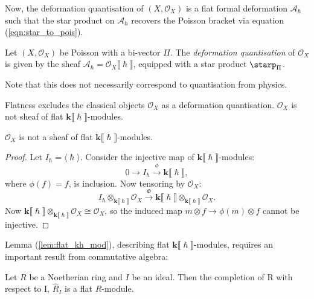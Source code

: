     
    

    Now, the deformation quantisation of \( (X,\mathcal{O}_X)\) is a flat formal deformation \( \mathcal{A}_{\hslash}\) such that the star product on \( \mathcal{A}_{\hslash}\) recovers the Poisson bracket via equation (\ref{eqn:star_to_pois}).

    \begin{defn} 
    \label{defn:def_quant}
    Let \( (X,\mathcal{O}_X)\) be Poisson with a bi-vector \( \Pi\). The \emph{deformation quantisation} of \( \mathcal{O}_X\) is given by the sheaf \( \mathcal{A}_{\hslash} = \mathcal{O}_X \lBrack \hslash \rBrack \), equipped with a star product \( \starp_{\Pi} \).
    \end{defn}
    Note that this does not necessarily correspond to quantisation from physics.

    
    
    Flatness excludes the classical objects \( \mathcal{O}_X\) as a deformation quantisation. \(\mathcal{O}_X\) is not sheaf of flat \( \mathbf{k}\lBrack \hslash \rBrack\)-modules.




    \begin{lem} \( \mathcal{O}_X\) is not a sheaf of flat \( \mathbf{k}\lBrack \hslash \rBrack\)-modules.
    \end{lem}
    \begin{proof}
    Let \( I_{\hslash} = \langle \hslash \rangle \). 
    Consider the injective map of \( \mathbf{k} \lBrack \hslash \rBrack\)-modules:
    \[ 0 \rightarrow  I_{\hslash} \overset{\phi}{\rightarrow} \mathbf{k} \lBrack \hslash \rBrack,\]
    where \( \phi(f)  = f\), is inclusion. Now tensoring by \( \mathcal{O}_X\):
    \[ I_{\hslash} \otimes_{\mathbf{k}\lBrack \hslash \rBrack} \mathcal{O}_X \overset{\Phi}{\rightarrow} \mathbf{k}\lBrack \hslash \rBrack \otimes_{\mathbf{k}\lBrack \hslash \rBrack} \mathcal{O}_X. \]
    Now  \( \mathbf{k}\lBrack \hslash \rBrack \otimes_{\mathbf{k}\lBrack \hslash \rBrack} \mathcal{O}_X \cong \mathcal{O}_X\), so the induced map \( m \otimes f \rightarrow \phi(m) \otimes f \) cannot be injective.  %
    \end{proof}

    
    Lemma (\ref{lem:flat_kh_mod}), describing flat \( \mathbf{k}\lBrack\hslash\rBrack\)-modules, requires an important result from commutative algebra:
    \begin{lem} 
    \label{lem:complete_flat}
    Let \(R\) be a Noetherian ring and \(I\) be an ideal. Then the completion of R with respect to I, \(\widehat{R}_I\) is a flat \(R\)-module.
    \end{lem}




